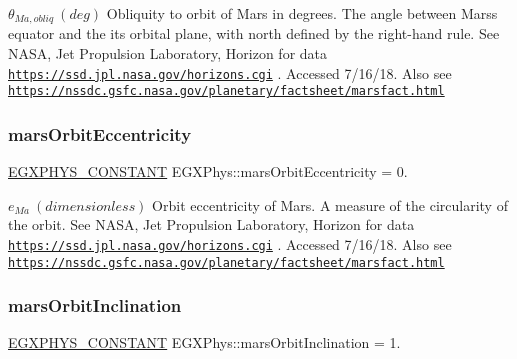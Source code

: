 $ \theta_{Ma,obliq} \ (deg)$ Obliquity to orbit of Mars in degrees. The angle between Mars\textquotesingle{}s equator and the it\textquotesingle{}s orbital plane, with north defined by the right-\/hand rule. See N\+A\+SA, Jet Propulsion Laboratory, Horizon for data \href{https://ssd.jpl.nasa.gov/horizons.cgi}{\tt https\+://ssd.\+jpl.\+nasa.\+gov/horizons.\+cgi} . Accessed 7/16/18. Also see \href{https://nssdc.gsfc.nasa.gov/planetary/factsheet/marsfact.html}{\tt https\+://nssdc.\+gsfc.\+nasa.\+gov/planetary/factsheet/marsfact.\+html} \mbox{\label{group___e_g_x_phys-_constants-_astrophysics-_solar_system-_mars-_orbit_ga1b5708fc19696debf75e5b77a04434ae}} 
\subsubsection{\texorpdfstring{mars\+Orbit\+Eccentricity}{marsOrbitEccentricity}}
{\footnotesize\ttfamily \mbox{\hyperlink{group___e_g_x_phys-_constants-_macros_ga76980d288494ce1714c9ac68a95ba702}{E\+G\+X\+P\+H\+Y\+S\+\_\+\+C\+O\+N\+S\+T\+A\+NT}} E\+G\+X\+Phys\+::mars\+Orbit\+Eccentricity = 0.}

$ e_{Ma} \ (dimensionless)$ Orbit eccentricity of Mars. A measure of the circularity of the orbit. See N\+A\+SA, Jet Propulsion Laboratory, Horizon for data \href{https://ssd.jpl.nasa.gov/horizons.cgi}{\tt https\+://ssd.\+jpl.\+nasa.\+gov/horizons.\+cgi} . Accessed 7/16/18. Also see \href{https://nssdc.gsfc.nasa.gov/planetary/factsheet/marsfact.html}{\tt https\+://nssdc.\+gsfc.\+nasa.\+gov/planetary/factsheet/marsfact.\+html} \mbox{\label{group___e_g_x_phys-_constants-_astrophysics-_solar_system-_mars-_orbit_gacc77eabca0e692365129623a51d11415}} 
\subsubsection{\texorpdfstring{mars\+Orbit\+Inclination}{marsOrbitInclination}}
{\footnotesize\ttfamily \mbox{\hyperlink{group___e_g_x_phys-_constants-_macros_ga76980d288494ce1714c9ac68a95ba702}{E\+G\+X\+P\+H\+Y\+S\+\_\+\+C\+O\+N\+S\+T\+A\+NT}} E\+G\+X\+Phys\+::mars\+Orbit\+Inclination = 1.}

